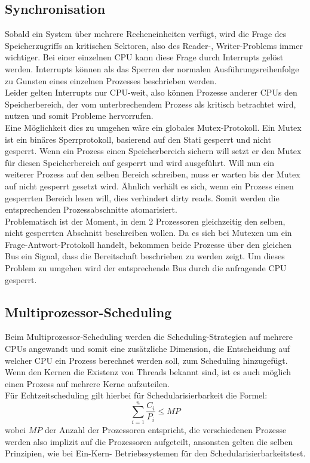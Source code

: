\subsection{Synchronisation}
Sobald ein System über mehrere Recheneinheiten verfügt, wird die Frage des Speicherzugriffs an kritischen
Sektoren, also des Reader-, Writer-Problems immer wichtiger. Bei einer einzelnen CPU kann diese Frage durch
Interrupts gelöst werden. Interrupts können als das Sperren der normalen Ausführungsreihenfolge zu Gunsten
eines einzelnen Prozesses beschrieben werden. \\
Leider gelten Interrupts nur CPU-weit, also können Prozesse anderer CPUs den Speicherbereich, der vom 
unterbrechendem Prozess als kritisch betrachtet wird, nutzen und somit Probleme hervorrufen. \\
Eine Möglichkeit dies zu umgehen wäre ein globales Mutex-Protokoll. Ein Mutex ist ein binäres 
Sperrprotokoll, basierend auf den Stati gesperrt und nicht gesperrt. Wenn ein Prozess einen Speicherbereich 
sichern will setzt er den Mutex für diesen Speicherbereich auf gesperrt und wird ausgeführt. Will nun ein 
weiterer Prozess auf den selben Bereich schreiben, muss er warten bis der Mutex auf nicht gesperrt gesetzt 
wird. Ähnlich verhält es sich, wenn ein Prozess einen gesperrten Bereich lesen will, dies verhindert dirty 
reads. Somit werden die entsprechenden Prozessabschnitte atomarisiert. \\
Problematisch ist der Moment, in dem 2 Prozessoren gleichzeitig den selben, nicht gesperrten Abschnitt 
beschreiben wollen. Da es sich bei Mutexen um ein Frage-Antwort-Protokoll handelt, bekommen beide Prozesse 
über den gleichen Bus ein Signal, dass die Bereitschaft beschrieben zu werden zeigt. Um dieses Problem zu 
umgehen wird der entsprechende Bus durch die anfragende CPU gesperrt.

\subsection{Multiprozessor-Scheduling}
Beim Multiprozessor-Scheduling werden die Scheduling-Strategien auf mehrere CPUs angewandt und somit eine 
zusätzliche Dimension, die Entscheidung auf welcher CPU ein Prozess berechnet werden soll, zum Scheduling 
hinzugefügt. Wenn den Kernen die Existenz von Threads bekannt sind, ist es auch möglich einen Prozess auf 
mehrere Kerne aufzuteilen. \cite{tanenb2009} \\
Für Echtzeitscheduling gilt hierbei für Schedularisierbarkeit die Formel: \[\sum\limits_{i=1}^{n}\frac{C_i}
{P_i} \leq MP\] wobei \(MP\) der Anzahl der Prozessoren entspricht, die verschiedenen Prozesse werden also 
implizit auf die Prozessoren aufgeteilt, ansonsten gelten die selben Prinzipien, wie bei Ein-Kern-
Betriebssystemen für den Schedularisierbarkeitstest.
\\

